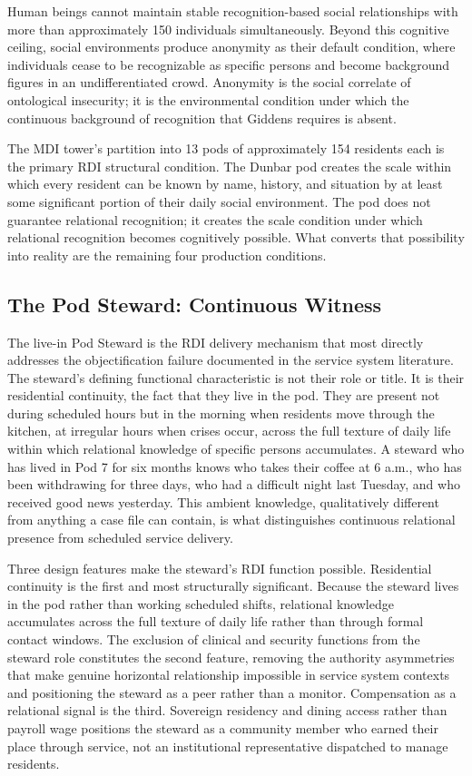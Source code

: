 \documentclass[12pt, letterpaper]{article}
\begin{document}
Human beings cannot maintain stable recognition-based social relationships with more than approximately 150 individuals simultaneously. Beyond this cognitive ceiling, social environments produce anonymity as their default condition, where individuals cease to be recognizable as specific persons and become background figures in an undifferentiated crowd. Anonymity is the social correlate of ontological insecurity; it is the environmental condition under which the continuous background of recognition that Giddens requires is absent.

The MDI tower's partition into 13 pods of approximately 154 residents each is the primary RDI structural condition. The Dunbar pod creates the scale within which every resident can be known by name, history, and situation by at least some significant portion of their daily social environment. The pod does not guarantee relational recognition; it creates the scale condition under which relational recognition becomes cognitively possible. What converts that possibility into reality are the remaining four production conditions.

\subsection{The Pod Steward: Continuous Witness}

The live-in Pod Steward is the RDI delivery mechanism that most directly addresses the objectification failure documented in the service system literature. The steward's defining functional characteristic is not their role or title. It is their residential continuity, the fact that they live in the pod. They are present not during scheduled hours but in the morning when residents move through the kitchen, at irregular hours when crises occur, across the full texture of daily life within which relational knowledge of specific persons accumulates. A steward who has lived in Pod 7 for six months knows who takes their coffee at 6 a.m., who has been withdrawing for three days, who had a difficult night last Tuesday, and who received good news yesterday. This ambient knowledge, qualitatively different from anything a case file can contain, is what distinguishes continuous relational presence from scheduled service delivery.

Three design features make the steward's RDI function possible. Residential continuity is the first and most structurally significant. Because the steward lives in the pod rather than working scheduled shifts, relational knowledge accumulates across the full texture of daily life rather than through formal contact windows. The exclusion of clinical and security functions from the steward role constitutes the second feature, removing the authority asymmetries that make genuine horizontal relationship impossible in service system contexts and positioning the steward as a peer rather than a monitor. Compensation as a relational signal is the third. Sovereign residency and dining access rather than payroll wage positions the steward as a community member who earned their place through service, not an institutional representative dispatched to manage residents.
\end{document}
